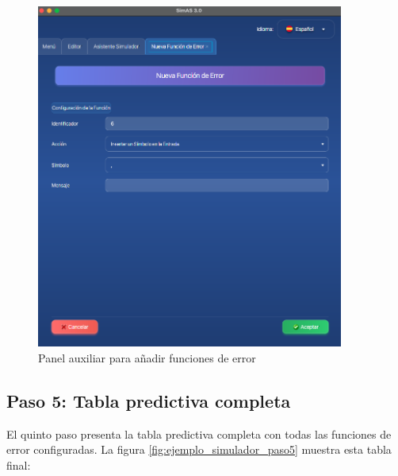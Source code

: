 \needspace{8cm}
\begin{figure}[H]
    \centering
    \includegraphics[width=0.9\textwidth]{figuras/ejemplo_practico/insertar_funcion_error.png}
    \caption{Panel auxiliar para añadir funciones de error}
    \label{fig:ejemplo_insertar_funcion_error}
\end{figure}

\subsection{Paso 5: Tabla predictiva completa}

El quinto paso presenta la tabla predictiva completa con todas las funciones de error configuradas. La figura \ref{fig:ejemplo_simulador_paso5} muestra esta tabla final:


